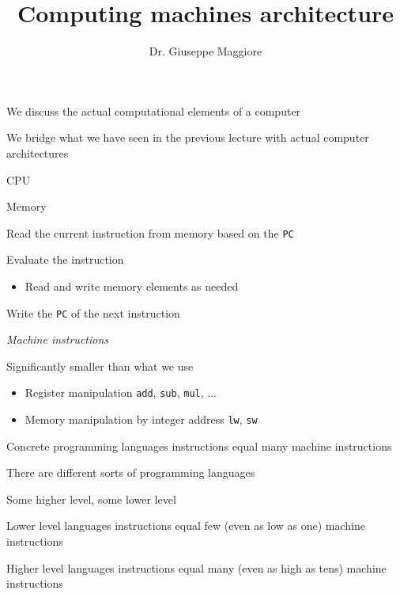 \documentclass{beamer}
\title{Computing machines architecture}
\author{Dr. Giuseppe Maggiore}
\institute{Hogeschool Rotterdam \\ 
Rotterdam, Netherlands}
\date{}
\begin{document}
\maketitle

\begin{slide}{
\item We discuss the actual computational elements of a computer
\item We bridge what we have seen in the previous lecture with actual computer architectures
}\end{slide}

\begin{slide}{
\item CPU
\item Memory
}\end{slide}

\begin{slide}{
\item Read the current instruction from memory based on the \texttt{PC}
\item Evaluate the instruction
\begin{itemize}
\item Read and write memory elements as needed
\end{itemize}
\item Write the \texttt{PC} of the next instruction
}\end{slide}

\begin{slide}{
\item \textit{Machine instructions}
\item Significantly smaller than what we use
\begin{itemize}
\item Register manipulation \texttt{add}, \texttt{sub}, \texttt{mul}, ...
\item Memory manipulation by integer address \texttt{lw}, \texttt{sw}
\end{itemize}
\item Concrete programming languages instructions equal many machine instructions
}\end{slide}

\begin{slide}{
\item There are different sorts of programming languages
\item Some higher level, some lower level
\item Lower level languages instructions equal few (even as low as one) machine instructions
\pause
\item Higher level languages instructions equal many (even as high as tens) machine instructions
}\end{slide}
\end{document}
